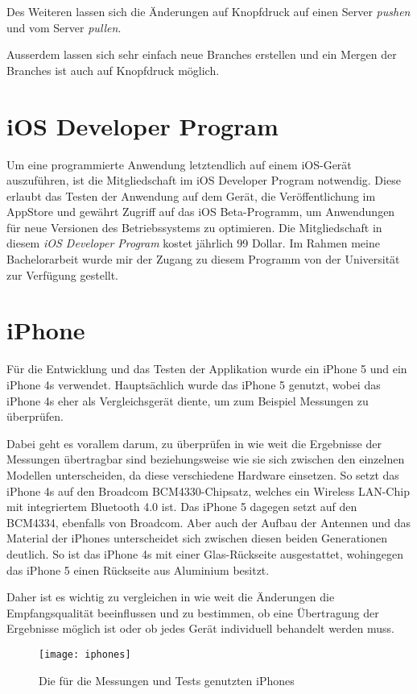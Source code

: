 Des Weiteren lassen sich die Änderungen auf Knopfdruck auf einen Server \emph{pushen} und vom Server \emph{pullen}.

Ausserdem lassen sich sehr einfach neue Branches erstellen und ein Mergen der Branches ist auch auf Knopfdruck möglich.


\section{iOS Developer Program}
\label{sec:iosdevprogram}
Um eine programmierte Anwendung letztendlich auf einem iOS-Gerät auszuführen, ist die Mitgliedschaft im iOS Developer Program notwendig.
Diese erlaubt das Testen der Anwendung auf dem Gerät, die Veröffentlichung im AppStore und gewährt Zugriff auf das iOS Beta-Programm, um Anwendungen für neue Versionen des Betriebssystems zu optimieren.
Die Mitgliedschaft in diesem \emph{iOS Developer Program} kostet jährlich 99 Dollar. 
Im Rahmen meine Bachelorarbeit wurde mir der Zugang zu diesem Programm von der Universität zur Verfügung gestellt.



\section{iPhone}
\label{sec:tools:iphone}
Für die Entwicklung und das Testen der Applikation wurde ein iPhone 5 und ein iPhone 4s verwendet. 
Hauptsächlich wurde das iPhone 5 genutzt, wobei das iPhone 4s eher als Vergleichsgerät diente, um zum Beispiel Messungen zu überprüfen.

Dabei geht es vorallem darum, zu überprüfen in wie weit die Ergebnisse der Messungen übertragbar sind beziehungsweise wie sie sich zwischen den einzelnen Modellen unterscheiden, da diese verschiedene Hardware einsetzen. So setzt das iPhone 4s auf den Broadcom BCM4330-Chipsatz, welches ein Wireless LAN-Chip mit integriertem Bluetooth 4.0 ist. Das iPhone 5 dagegen setzt auf den BCM4334, ebenfalls von Broadcom. 
Aber auch der Aufbau der Antennen und das Material der iPhones unterscheidet sich zwischen diesen beiden Generationen deutlich. 
So ist das iPhone 4s mit einer Glas-Rückseite ausgestattet, wohingegen das iPhone 5 einen Rückseite aus Aluminium besitzt.

Daher ist es wichtig zu vergleichen in wie weit die Änderungen die Empfangsqualität beeinflussen und zu bestimmen, ob eine Übertragung der Ergebnisse möglich ist oder ob jedes Gerät individuell behandelt werden muss.

\begin{figure}[htb!]
		\centering
	\texttt{[image: iphones]}
	\caption{Die für die Messungen und Tests genutzten iPhones}
	\label{iphones}
\end{figure}



